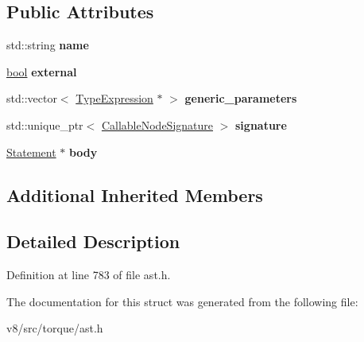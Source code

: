 \subsection*{Public Attributes}
\begin{DoxyCompactItemize}
\item 
\mbox{\label{structv8_1_1internal_1_1torque_1_1SpecializationDeclaration_a3b0e150da97c6b02c6ed5bf370fd5d7e}} 
std\+::string {\bfseries name}
\item 
\mbox{\label{structv8_1_1internal_1_1torque_1_1SpecializationDeclaration_aec52408ad04309889053b738bbc534aa}} 
\mbox{\hyperlink{classbool}{bool}} {\bfseries external}
\item 
\mbox{\label{structv8_1_1internal_1_1torque_1_1SpecializationDeclaration_ab1d66cd1cf557f92fd843d83976d7b7d}} 
std\+::vector$<$ \mbox{\hyperlink{structv8_1_1internal_1_1torque_1_1TypeExpression}{Type\+Expression}} $\ast$ $>$ {\bfseries generic\+\_\+parameters}
\item 
\mbox{\label{structv8_1_1internal_1_1torque_1_1SpecializationDeclaration_a4a2a70652269db838f6c0a39f473fa62}} 
std\+::unique\+\_\+ptr$<$ \mbox{\hyperlink{structv8_1_1internal_1_1torque_1_1CallableNodeSignature}{Callable\+Node\+Signature}} $>$ {\bfseries signature}
\item 
\mbox{\label{structv8_1_1internal_1_1torque_1_1SpecializationDeclaration_a6e3023c55779624efcf0027b8a581b7f}} 
\mbox{\hyperlink{structv8_1_1internal_1_1torque_1_1Statement}{Statement}} $\ast$ {\bfseries body}
\end{DoxyCompactItemize}
\subsection*{Additional Inherited Members}


\subsection{Detailed Description}


Definition at line 783 of file ast.\+h.



The documentation for this struct was generated from the following file\+:\begin{DoxyCompactItemize}
\item 
v8/src/torque/ast.\+h\end{DoxyCompactItemize}
